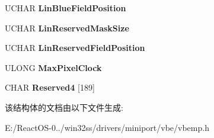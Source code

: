 \begin{DoxyCompactItemize}
\mbox{\label{struct_v_b_e___m_o_d_e_i_n_f_o_a51f5a20589059e46f59091861a59c952}} 
U\+C\+H\+AR {\bfseries Lin\+Blue\+Field\+Position}
\item 
\mbox{\label{struct_v_b_e___m_o_d_e_i_n_f_o_adb763dda3f845b2a3f7e66a66f150273}} 
U\+C\+H\+AR {\bfseries Lin\+Reserved\+Mask\+Size}
\item 
\mbox{\label{struct_v_b_e___m_o_d_e_i_n_f_o_a533c13e36660e0e715efae080ee48d40}} 
U\+C\+H\+AR {\bfseries Lin\+Reserved\+Field\+Position}
\item 
\mbox{\label{struct_v_b_e___m_o_d_e_i_n_f_o_a68d23e8bb10d7eee41f7c0b37fbf693d}} 
U\+L\+O\+NG {\bfseries Max\+Pixel\+Clock}
\item 
\mbox{\label{struct_v_b_e___m_o_d_e_i_n_f_o_aab6a5772f966e8d8e858e461f9a6fadb}} 
C\+H\+AR {\bfseries Reserved4} \mbox{[}189\mbox{]}
\end{DoxyCompactItemize}


该结构体的文档由以下文件生成\+:\begin{DoxyCompactItemize}
\item 
E\+:/\+React\+O\+S-\/0../win32ss/drivers/miniport/vbe/vbemp.\+h\end{DoxyCompactItemize}
